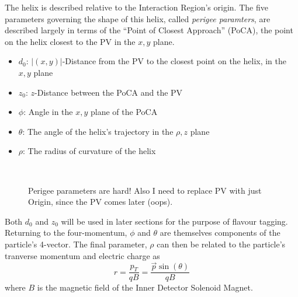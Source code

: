             The helix is described relative to the Interaction Region's origin.
            The five parameters governing the shape of this helix, called \textit{perigee paramters}, 
                are described largely in terms of the ``Point of Closest Approach'' (PoCA),
                the point on the helix closest to the PV in the $x,y$ plane.
            \begin{itemize}
                \item $d_0$: $|(x,y)|$-Distance from the PV to the closest point on the helix, in the $x,y$ plane
                \item $z_0$: $z$-Distance between the PoCA and the PV
                \item $\phi$: Angle in the $x,y$ plane of the PoCA
                \item $\theta$: The angle of the helix's trajectory in the $\rho,z$ plane
                \item $\rho$: The radius of curvature of the helix
            \end{itemize}

            \begin{figure}
                \\
                \caption{
                    Perigee parameters are hard! Also I need to replace PV with just Origin, since the PV comes later (oops).
                }
                \label{fig:perigee_params}
            \end{figure}
            

            Both $d_0$ and $z_0$ will be used in later sections for the purpose of flavour tagging.
            Returning to the four-momentum, $\phi$ and $\theta$ are themselves components of the particle's 4-vector.
            The final parameter, $\rho$ can then be related to the particle's tranverse momentum and electric charge as
            \begin{equation}
            r = \frac{p_T}{qB} = \frac{\vec{p} \sin(\theta)}{qB}
            \end{equation}
            where $B$ is the magnetic field of the Inner Detector Solenoid Magnet.
            \cite{thesis_track_sim_and_reco}

